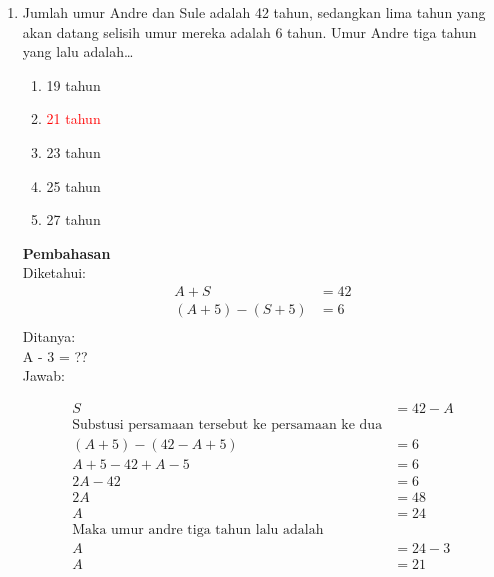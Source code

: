 \documentclass{report}
\newcommand{\options}[5]{
\begin{enumerate}[label=\alph*.]
	\item #1
	\item #2
	\item #3
	\item #4
	\item #5
\end{enumerate}
}
\newcommand{\pemb}{ \textbf{Pembahasan} \\}
\begin{document}
\begin{enumerate}
\item Jumlah umur Andre dan Sule adalah 42 tahun, sedangkan lima tahun yang akan datang selisih umur mereka adalah 6 tahun. Umur Andre tiga tahun yang lalu adalah\ldots
\options
{19 tahun}
{\textcolor{red}{21 tahun}}
{23 tahun}
{25 tahun}
{27 tahun}
\pemb
Diketahui: \\
\begin{align*}
	A + S &= 42 \\
	(A + 5) - (S + 5) &= 6 \\
\end{align*} Ditanya: \\
A - 3 = ?? \\
Jawab: \\
\begin{center}
\begin{align*}
	S &= 42 - A \\
	\text{Substusi persamaan tersebut ke persamaan ke dua}\\
	(A + 5) - (42 - A + 5) &= 6 \\
	A + 5 - 42 + A - 5 &= 6 \\
	           2A - 42 &= 6 \\
			2A &= 48 \\
			 A &= 24 \\
	\text{Maka umur andre tiga tahun lalu adalah}\\
			 A &= 24 - 3\\
			 A &= 21 \\
\end{align*}
\end{center}


\end{enumerate}
\end{document}
